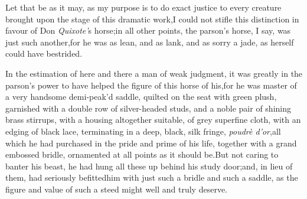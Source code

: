 \documentclass{article}
\begin{document}
Let that be as it may, as my purpose is to do exact justice to
every creature brought upon the stage of this dramatic
work,\tsk  I could not stifle this distinction in favour of Don
\textit{Quixote’}s horse;\tsh  in all other points, the
parson’s horse, I say, was just such another,\tsk for he was as
lean, and as lank, and as sorry a jade, as 
herself could have bestrided.

In the estimation of here and there a man of weak judgment, it was greatly
in the parson’s power to have helped the figure of
this horse of his,\tsk  for he was master of a very handsome
demi-peak’d saddle, quilted on the seat with green plush,
garnished with a double row of silver-headed studs, and a noble
pair of shining brass stirrups, with a housing altogether
suitable, of grey superfine cloth, with an edging of black lace,
terminating in a deep, black, silk fringe, \textit{poudrè
d’or},\tsk  all which he had purchased in the pride and prime of
his life, together with a grand embossed bridle, ornamented at
all points as it should be.\tsh  But not caring to banter his
beast, he had hung all these up behind his study door;\tsk and, in
lieu of them, had seriously befitted\break him with just such a bridle
and such a saddle, as the figure and value of such a steed might
well and truly deserve.
\end{document}
